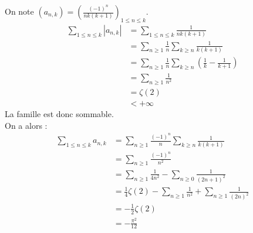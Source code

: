 \documentclass[../main.tex]{subfiles}
\begin{document}
\noindent On note $(a_{n, k}) = \left( \frac{(-1)^n}{nk(k+1)} \right)_{1\leq n\leq k}$. 
\begin{align*}
    \sum_{1\leq n\leq k} |a_{n, k}| &= \sum_{1\leq n\leq k} \frac{1}{nk(k+1)} \\
    &= \sum_{n\geq 1} \frac{1}{n} \sum_{k\geq n} \frac{1}{k(k+1)} \\
    &= \sum_{n\geq 1} \frac{1}{n} \sum_{k\geq n} \left( \frac{1}{k} - \frac{1}{k+1} \right) \\
    &= \sum_{n\geq 1} \frac{1}{n^2} \\
    &= \zeta(2) \\
    &< +\infty 
\end{align*}
La famille est donc sommable. \\
On a alors : 
\begin{align*}
    \sum_{1\leq n\leq k} a_{n, k} &= \sum_{n\geq 1} \frac{(-1)^n}{n} \sum_{k\geq n} \frac{1}{k(k+1)} \\
    &= \sum_{n\geq 1} \frac{(-1)^n}{n^2} \\
    &= \sum_{n\geq 1} \frac{1}{4n^2} - \sum_{n\geq 0} \frac{1}{(2n+1)^2} \\
    &= \frac{1}{4} \zeta(2) - \sum_{n\geq 1} \frac{1}{n^2} + \sum_{n\geq 1} \frac{1}{(2n)^2} \\
    &= -\frac{1}{2} \zeta(2) \\
    &= -\frac{\pi^2}{12}
\end{align*}
\end{document}
